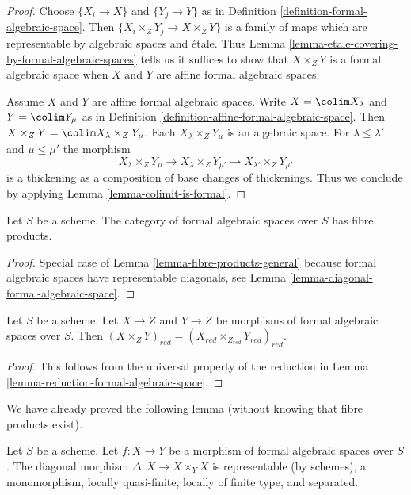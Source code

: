 \begin{proof}
Choose $\{X_i \to X\}$ and $\{Y_j \to Y\}$ as in
Definition \ref{definition-formal-algebraic-space}.
Then $\{X_i \times_Z Y_j \to X \times_Z Y\}$ is a family
of maps which are representable by algebraic spaces and \'etale.
Thus Lemma \ref{lemma-etale-covering-by-formal-algebraic-spaces}
tells us it suffices to show that $X \times_Z Y$ is a formal
algebraic space when $X$ and $Y$ are affine formal algebraic spaces.

\medskip\noindent
Assume $X$ and $Y$ are affine formal algebraic spaces.
Write $X = \colim X_\lambda$ and $Y = \colim Y_\mu$ as
in Definition \ref{definition-affine-formal-algebraic-space}.
Then $X \times_Z Y = \colim X_\lambda \times_Z Y_\mu$.
Each $X_\lambda \times_Z Y_\mu$ is an algebraic space.
For $\lambda \leq \lambda'$ and $\mu \leq \mu'$ the morphism
$$
X_\lambda \times_Z Y_\mu \to
X_\lambda \times_Z Y_{\mu'} \to
X_{\lambda'} \times_Z Y_{\mu'}
$$
is a thickening as a composition of base changes of thickenings.
Thus we conclude by applying Lemma \ref{lemma-colimit-is-formal}.
\end{proof}

\begin{lemma}
\label{lemma-fibre-products}
Let $S$ be a scheme. The category of formal algebraic spaces over $S$
has fibre products.
\end{lemma}

\begin{proof}
Special case of Lemma \ref{lemma-fibre-products-general}
because formal algebraic spaces have representable diagonals, see
Lemma \ref{lemma-diagonal-formal-algebraic-space}.
\end{proof}

\begin{lemma}
\label{lemma-reduction-fibre-products}
Let $S$ be a scheme. Let $X \to Z$ and $Y \to Z$ be morphisms of
formal algebraic spaces over $S$. Then
$(X \times_Z Y)_{red} = (X_{red} \times_{Z_{red}} Y_{red})_{red}$.
\end{lemma}

\begin{proof}
This follows from the universal property of the reduction
in Lemma \ref{lemma-reduction-formal-algebraic-space}.
\end{proof}

\noindent
We have already proved the following lemma (without knowing that
fibre products exist).

\begin{lemma}
\label{lemma-diagonal-morphism-formal-algebraic-spaces}
Let $S$ be a scheme. Let $f : X \to Y$ be a morphism of formal algebraic spaces
over $S$. The diagonal morphism $\Delta : X \to X \times_Y X$
is representable (by schemes), a monomorphism, locally quasi-finite,
locally of finite type, and separated.
\end{lemma}

